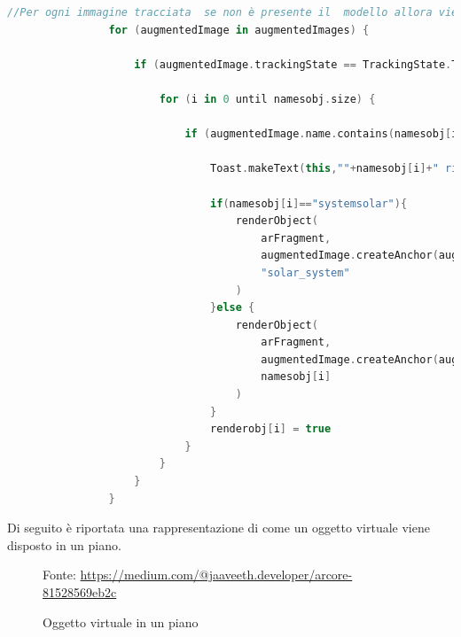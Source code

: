 \documentclass[crop=false, class=book]{standalone}
\begin{document}
		\begin{center}
			\begin{minipage}{1.1\textwidth}
				\begin{lstlisting}[caption={Definizione Anchor in Augmented Images}, label={lst: Definizione Anchor in Augmented Images}, 	language=Kotlin]
				//Per ogni immagine tracciata  se non è presente il  modello allora viene immediatamente costruito e instanziato
        		for (augmentedImage in augmentedImages) {

            		if (augmentedImage.trackingState == TrackingState.TRACKING) {

                		for (i in 0 until namesobj.size) {

                    		if (augmentedImage.name.contains(namesobj[i]) && !renderobj[i]) {

                        		Toast.makeText(this,""+namesobj[i]+" rilevato",Toast.LENGTH_SHORT).show()

                        		if(namesobj[i]=="systemsolar"){
                            		renderObject(
                                		arFragment,
                                		augmentedImage.createAnchor(augmentedImage.centerPose),
                                		"solar_system"
                            		)
                        		}else {
                            		renderObject(
                                		arFragment,
                                		augmentedImage.createAnchor(augmentedImage.centerPose),
                                		namesobj[i]
                            		)
                        		}	
                        		renderobj[i] = true
                    		}
                		}
            		}
        		}
					\end{lstlisting}
			\end{minipage}
		\end{center}
	
		\clearpage
		
		\begin{flushleft}
			Di seguito è riportata una rappresentazione di come un oggetto virtuale viene disposto in un piano.
		\end{flushleft}
		\begin{figure}
				\centering
				{Fonte: \url{https://medium.com/@jaaveeth.developer/arcore-81528569eb2c}}
				\caption{Oggetto virtuale in un piano}
				\label{fig: Oggetto virtuale in un piano}
		\end{figure}	
\end{document}
